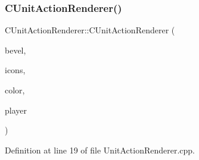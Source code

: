 \subsubsection{\texorpdfstring{C\+Unit\+Action\+Renderer()}{CUnitActionRenderer()}}
{\footnotesize\ttfamily C\+Unit\+Action\+Renderer\+::\+C\+Unit\+Action\+Renderer (\begin{DoxyParamCaption}\item[{std\+::shared\+\_\+ptr$<$ \hyperlink{classCBevel}{C\+Bevel} $>$}]{bevel,  }\item[{std\+::shared\+\_\+ptr$<$ \hyperlink{classCGraphicTileset}{C\+Graphic\+Tileset} $>$}]{icons,  }\item[{\hyperlink{GameDataTypes_8h_aafb0ca75933357ff28a6d7efbdd7602f}{E\+Player\+Color}}]{color,  }\item[{std\+::shared\+\_\+ptr$<$ \hyperlink{classCPlayerData}{C\+Player\+Data} $>$}]{player }\end{DoxyParamCaption})}



Definition at line 19 of file Unit\+Action\+Renderer.\+cpp.


